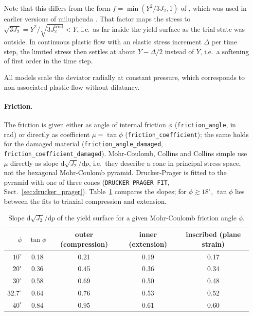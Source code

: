 \documentclass[10pt,fleqn,twoside]{article}
\newcommand{\code}[1]{\texttt{#1}}
\newcommand{\sw}[1]{\texttt{#1}}
\newcommand{\dd}{\mathrm{d}}
\begin{document}
Note that this differs from the form $f = \min(Y^2/3J_2, 1)$ of \citet{benasp94,benz:1995}, which was used in earlier
versions of miluphcuda \citep[eq.~17]{schaefer2016}. That factor maps the stress to
$\sqrt{3J_2} = Y^2/\sqrt{3J_2^\mathrm{trial}} < Y$, i.e.\ as far inside the yield surface as the trial state was
outside. In continuous plastic flow with an elastic stress increment $\Delta$ per time step, the limited stress
then settles at about $Y - \Delta/2$ instead of $Y$, i.e.\ a softening of first order in the time step.

All models scale the deviator radially at constant pressure, which corresponds to non-associated plastic flow
without dilatancy.

\paragraph{Friction.} The friction is given either as angle of internal friction $\phi$ (\code{friction\_angle}, in
rad) or directly as coefficient $\mu = \tan\phi$ (\code{friction\_coefficient}); the same holds for the damaged
material (\code{friction\_angle\_damaged}, \code{friction\_coefficient\_damaged}). Mohr-Coulomb, Collins and Collins
simple use $\mu$ directly as slope $\dd\sqrt{J_2}/\dd p$, i.e.\ they describe a cone in principal stress space, not the
hexagonal Mohr-Coulomb pyramid. Drucker-Prager is fitted to the pyramid with one of three cones
(\sw{DRUCKER\_PRAGER\_FIT}, Sect.~\ref{sec:drucker_prager}). Table~\ref{tab:friction_fits} compares the slopes; for
$\phi \gtrsim 18^\circ$, $\tan\phi$ lies between the fits to triaxial compression and extension.

\begin{table}[h]
\centering
\small
\caption{Slope $\dd\sqrt{J_2}/\dd p$ of the yield surface for a given Mohr-Coulomb friction angle $\phi$.}
\label{tab:friction_fits}
\begin{tabular}{rcccc}
\toprule
$\phi$ & $\tan\phi$ & outer (compression) & inner (extension) & inscribed (plane strain) \\
\midrule
$10^\circ$   & 0.18 & 0.21 & 0.19 & 0.17 \\
$20^\circ$   & 0.36 & 0.45 & 0.36 & 0.34 \\
$30^\circ$   & 0.58 & 0.69 & 0.50 & 0.48 \\
$32.7^\circ$ & 0.64 & 0.76 & 0.53 & 0.52 \\
$40^\circ$   & 0.84 & 0.95 & 0.61 & 0.60 \\
\bottomrule
\end{tabular}
\end{table}
\end{document}
